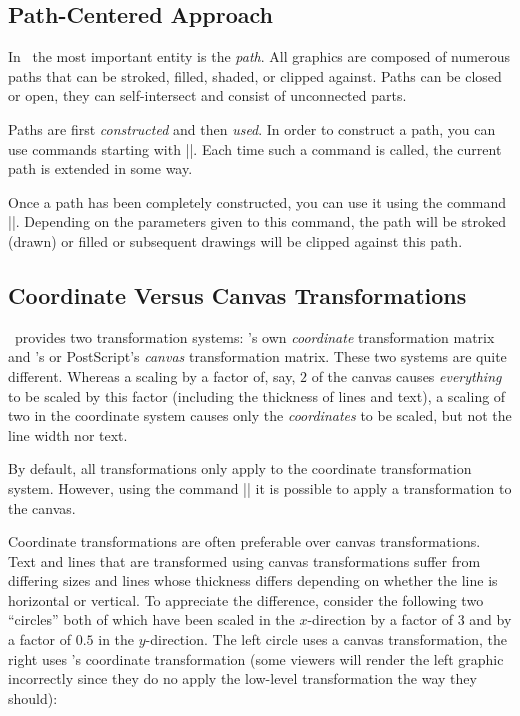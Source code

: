 \subsection{Path-Centered Approach}

In \pgfname\ the most important entity is the \emph{path}. All
graphics are composed of numerous paths that can be stroked,
filled, shaded, or clipped against. Paths can be closed or open, they
can self-intersect and consist of unconnected parts.

Paths are first \emph{constructed} and then \emph{used}. In order to
construct a path, you can use commands starting with |\pgfpath|. Each
time such a command is called, the current path is extended in some
way.

Once a path has been completely constructed, you can use it using the
command |\pgfusepath|. Depending on the parameters given to this
command, the path will be stroked (drawn) or filled or subsequent
drawings will be clipped against this path.




\subsection{Coordinate Versus Canvas Transformations}

\label{section-design-transformations}

\pgfname\ provides two transformation systems: \pgfname's own
\emph{coordinate} transformation matrix and \pdf's or PostScript's
\emph{canvas} transformation matrix. These two systems are quite
different. Whereas a scaling by a factor of, say, $2$ of the canvas
causes \emph{everything} to be scaled by this factor (including
the thickness of lines and text), a scaling of two in the coordinate
system causes only the \emph{coordinates} to be scaled, but not the
line width nor text.

By default, all transformations only apply to the coordinate
transformation system. However, using the command |\pgflowlevel|
it is possible to apply a transformation to the canvas.

Coordinate transformations are often preferable over canvas
transformations. Text and lines that are transformed using canvas
transformations suffer from differing sizes and lines whose thickness
differs depending on whether the line is horizontal or vertical. To
appreciate the difference, consider the following two ``circles'' both
of which have been scaled in the $x$-direction by a factor of $3$ and
by a factor of $0.5$ in the $y$-direction. The left circle uses a
canvas transformation, the right uses \pgfname's coordinate
transformation (some viewers will render the left graphic incorrectly
since they do no apply the low-level transformation the way they
should):

